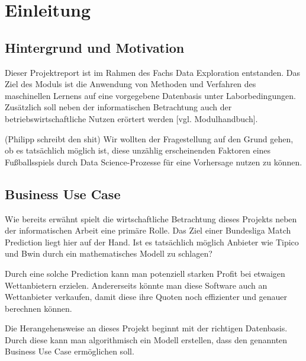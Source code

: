 \chapter{Einleitung}

\section{Hintergrund und Motivation}
Dieser Projektreport ist im Rahmen des Fachs Data Exploration entstanden. Das Ziel des Moduls ist die \glqq Anwendung von Methoden und Verfahren des maschinellen Lernens auf eine vorgegebene Datenbasis unter Laborbedingungen\grqq [Modulhandbuch]. Zusätzlich soll neben der informatischen Betrachtung auch der betriebswirtschaftliche Nutzen erörtert werden [vgl. Modulhandbuch].

(Philipp schreibt den shit)
Wir wollten der Fragestellung auf den Grund gehen, ob es tatsächlich möglich ist, diese unzählig erscheinenden Faktoren eines Fußballsspiels durch Data Science-Prozesse für eine Vorhersage nutzen zu können.

\section{Business Use Case}
Wie bereits erwähnt spielt die wirtschaftliche Betrachtung dieses Projekts neben der informatischen Arbeit eine primäre Rolle. Das Ziel einer Bundesliga Match Prediction liegt hier auf der Hand. Ist es tatsächlich möglich Anbieter wie Tipico und Bwin durch ein mathematisches Modell zu schlagen?

Durch eine solche Prediction kann man potenziell starken Profit bei etwaigen Wettanbietern erzielen. Andererseits könnte man diese Software auch an Wettanbieter verkaufen, damit diese ihre Quoten noch effizienter und genauer berechnen können. 

Die Herangehensweise an dieses Projekt beginnt mit der richtigen Datenbasis. Durch diese kann man algorithmisch ein Modell erstellen, dass den genannten Business Use Case ermöglichen soll.